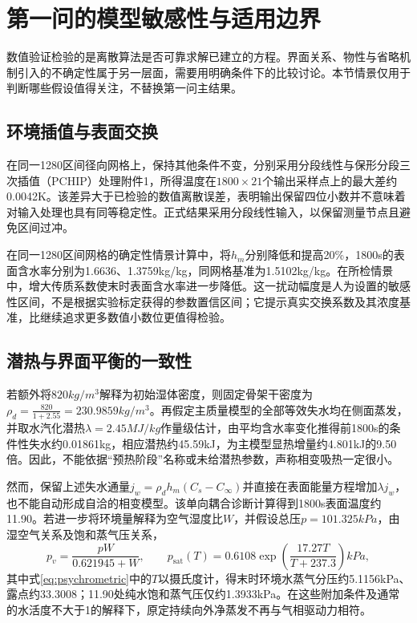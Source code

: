 \section{第一问的模型敏感性与适用边界}
数值验证检验的是离散算法是否可靠求解已建立的方程。界面关系、物性与省略机制引入的不确定性属于另一层面，需要用明确条件下的比较讨论。本节情景仅用于判断哪些假设值得关注，不替换第一问主结果。

\subsection{环境插值与表面交换}
在同一1280区间径向网格上，保持其他条件不变，分别采用分段线性与保形分段三次插值（PCHIP）处理附件1，所得温度在$1800\times21$个输出采样点上的最大差约0.0042\unit{K}。该差异大于已检验的数值离散误差，表明输出保留四位小数并不意味着对输入处理也具有同等稳定性。正式结果采用分段线性输入，以保留测量节点且避免区间过冲。

在同一1280区间网格的确定性情景计算中，将$h_m$分别降低和提高20\%，1800\unit{s}的表面含水率分别为1.6636、1.3759\unit{kg/kg}，同网格基准为1.5102\unit{kg/kg}。在所检情景中，增大传质系数使末时表面含水率进一步降低。这一扰动幅度是人为设置的敏感性区间，不是根据实验标定获得的参数置信区间；它提示真实交换系数及其浓度基准，比继续追求更多数值小数位更值得检验。

\subsection{潜热与界面平衡的一致性}
若额外将$820\unit{kg/m^3}$解释为初始湿体密度，则固定骨架干密度为$\rho_d=\frac{820}{1+2.55}=230.9859\unit{kg/m^3}$。再假定主质量模型的全部等效失水均在侧面蒸发，并取水汽化潜热$\lambda=2.45\unit{MJ/kg}$作量级估计\cite{fao}，由平均含水率变化推得前1800\unit{s}的条件性失水约0.01861\unit{kg}，相应潜热约45.59\unit{kJ}，为主模型显热增量约4.801\unit{kJ}的9.50倍。因此，不能依据“预热阶段”名称或未给潜热参数，声称相变吸热一定很小。

然而，保留上述失水通量$j_w=\rho_d h_m(C_s-C_\infty)$并直接在表面能量方程增加$\lambda j_w$，也不能自动形成自洽的相变模型。该单向耦合诊断计算得到1800\unit{s}表面温度约11.90\celsius。若进一步将环境量解释为空气湿度比$W$，并假设总压$p=101.325\unit{kPa}$，由湿空气关系\cite{ashrae}及饱和蒸气压关系\cite{fao}，
\begin{equation}
p_v=\frac{pW}{0.621945+W},\qquad
p_{\mathrm{sat}}(T)=0.6108\exp\!\left(\frac{17.27T}{T+237.3}\right)\unit{kPa},
\label{eq:psychrometric}
\end{equation}
其中式\eqref{eq:psychrometric}中的$T$以摄氏度计，得末时环境水蒸气分压约5.1156\unit{kPa}、露点约33.3008\celsius；11.90\celsius{}处纯水饱和蒸气压仅约1.3933\unit{kPa}。在这些附加条件及通常的水活度不大于1的解释下，原定持续向外净蒸发不再与气相驱动力相符。

